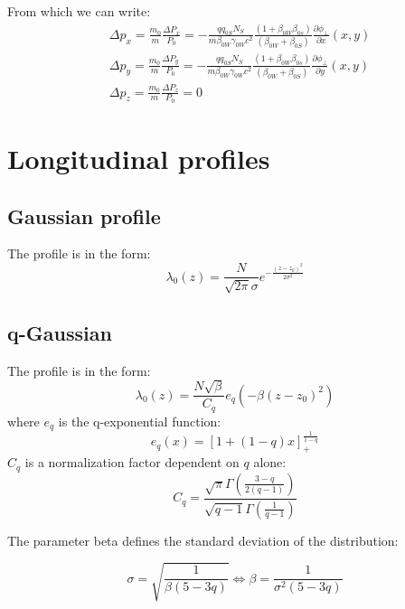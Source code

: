 From which we can write:
\begin{align}
&\boxed{
\Delta p_x = \frac{m_0}{m}\frac{\Delta P_x} {P_0}= -\frac{qq_{0S} N_S 
}{m\beta_{0W}\gamma_{0W}c^2}
\frac{(1+\beta_{0W}  \beta_{0s})}{(\beta_{0W}+\beta_{0S})}
\frac{\partial \phi_\perp}{\partial x}(x, y )}\\
&\boxed{
\Delta p_y = \frac{m_0}{m}\frac{\Delta P_y} {P_0}= -\frac{qq_{0S} N_S 
}{m\beta_{0W}\gamma_{0W}c^2}
\frac{(1+\beta_{0W}  \beta_{0s})}{(\beta_{0W}+\beta_{0S})}
\frac{\partial \phi_\perp}{\partial y}(x, y )}\\
&\boxed{
\Delta p_z = \frac{m_0}{m}\frac{\Delta P_z} {P_0}=0}
\end{align}

\section{Longitudinal profiles}

\subsection{Gaussian profile}

The profile is in the form:
\begin{equation}
\lambda_{0}(z)=\frac{N}{\sqrt{2 \pi} \sigma} e^{-\frac{(z-z_0)^{2}}{2 \sigma^{2}}}
\end{equation}


\subsection{q-Gaussian}

The profile is in the form:
\begin{equation}
\lambda_0(z)=\frac{N\sqrt{\beta}}{C_{q}} e_{q}\left(-\beta (z-z_0)^{2}\right)
\end{equation}
where $e_q$ is the q-exponential function:
\begin{equation}
e_{q}(x)=[1+(1-q) x]_{+}^{\frac{1}{1-q}}
\end{equation}
$C_q$ is a normalization factor dependent on $q$ alone:
\begin{equation}
C_{q}=\frac{\sqrt{\pi} \Gamma\left(\frac{3-q}{2(q-1)}\right)}{\sqrt{q-1} \Gamma\left(\frac{1}{q-1}\right)}
\end{equation}

The parameter beta defines the standard deviation of the distribution:

\begin{equation}
\sigma = \sqrt{\frac{1}{\beta(5-3 q)}} \iff \beta ={\frac{1}{\sigma^2(5-3 q)}}
\end{equation}



